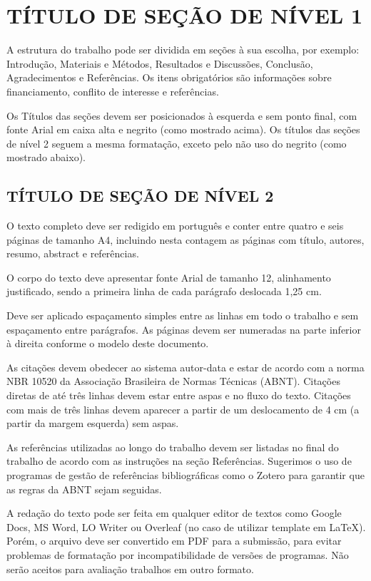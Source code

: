 \documentclass[%
  article,%
  a4paper,%
  11pt,%
  fleqn,%
  oneside,%
  chapter = TITLE,%
  section = TITLE,%
]{abntex2}
\begin{document}
\section{TÍTULO DE SEÇÃO DE NÍVEL 1}\label{sec:intro}

A estrutura do trabalho pode ser dividida em seções à sua escolha, por exemplo: Introdução, Materiais e Métodos, Resultados e Discussões, Conclusão, Agradecimentos e Referências. Os itens obrigatórios são informações sobre financiamento, conflito de interesse e referências.

Os Títulos das seções devem ser posicionados à esquerda e sem ponto final, com fonte Arial em caixa alta e negrito (como mostrado acima). Os títulos das seções de nível 2 seguem a mesma formatação, exceto pelo não uso do negrito (como mostrado abaixo).

\subsection{TÍTULO DE SEÇÃO DE NÍVEL 2}

O texto completo deve ser redigido em português e conter entre quatro e seis páginas de tamanho A4, incluindo nesta contagem as páginas com título, autores, resumo, abstract e referências.

O corpo do texto deve apresentar fonte Arial de tamanho 12, alinhamento justificado, sendo a primeira linha de cada parágrafo deslocada 1,25 cm.

Deve ser aplicado espaçamento simples entre as linhas em todo o trabalho e sem espaçamento entre parágrafos. As páginas devem ser numeradas na parte inferior à direita conforme o modelo deste documento.

As citações devem obedecer ao sistema autor-data e estar de acordo com a norma NBR 10520 da Associação Brasileira de Normas Técnicas (ABNT). Citações diretas de até três linhas devem estar entre aspas e no fluxo do texto. Citações com mais de três linhas devem aparecer a partir de um deslocamento de 4 cm (a partir da margem esquerda) sem aspas.

As referências utilizadas ao longo do trabalho devem ser listadas no final do trabalho de acordo com as instruções na seção Referências. Sugerimos o uso de programas de gestão de referências bibliográficas como o Zotero para garantir que as regras da ABNT sejam seguidas.

A redação do texto pode ser feita em qualquer editor de textos como Google Docs, MS Word, LO Writer ou Overleaf (no caso de utilizar template em \LaTeX). Porém, o arquivo deve ser convertido em PDF para a submissão, para evitar problemas de formatação por incompatibilidade de versões de programas. Não serão aceitos para avaliação trabalhos em outro formato.
\end{document}
